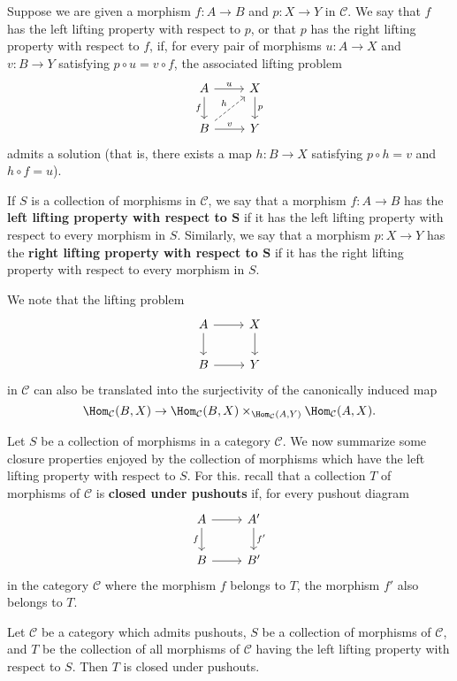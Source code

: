 Suppose we are given a morphism $f:A\to B$ and $p:X\to Y$ in $\mathcal{C}$. We say that $f$ has the left lifting property with respect to $p$, or that $p$ has the right lifting property with respect to $f$, if, for every pair of morphisms $u:A\to X$ and $v:B\to Y$ satisfying $p\circ u=v\circ f$, the associated lifting problem
\[\begin{tikzcd}
A\ar[r,"u"]\ar[d,swap,"f"]&X\ar[d,"p"]\\
B\ar[r,"v"]\ar[ru,dashed,"h"]&Y
\end{tikzcd}\]
admits a solution (that is, there exists a map $h:B\to X$ satisfying $p\circ h=v$ and $h\circ f=u$).\par
If $S$ is a collection of morphisms in $\mathcal{C}$, we say that a morphism $f:A\to B$ has the \textbf{left lifting property with respect to $\bm{S}$} if it has the left lifting property with respect to every morphism in $S$. Similarly, we say that a morphism $p:X\to Y$ has the \textbf{right lifting property with respect to $\bm{S}$} if it has the right lifting property with respect to every morphism in $S$.
\begin{remark}\label{category lifting problem iff surjectivity}
We note that the lifting problem
\[\begin{tikzcd}
A\ar[r]\ar[d,swap]&X\ar[d]\\
B\ar[r]&Y
\end{tikzcd}\]
in $\mathcal{C}$ can also be translated into the surjectivity of the canonically induced map
\[\Hom_{\mathcal{C}}(B,X)\to\Hom_{\mathcal{C}}(B,X)\times_{\Hom_{\mathcal{C}}(A,Y)}\Hom_{\mathcal{C}}(A,X).\]
\end{remark}
Let $S$ be a collection of morphisms in a category $\mathcal{C}$. We now summarize some closure properties enjoyed by the collection of morphisms which have the left lifting property with respect to $S$. For this. recall that a collection $T$ of morphisms of $\mathcal{C}$ is \textbf{closed under pushouts} if, for every pushout diagram
\[\begin{tikzcd}
A\ar[r]\ar[d,swap,"f"]&A'\ar[d,"f'"]\\
B\ar[r]&B'
\end{tikzcd}\]
in the category $\mathcal{C}$ where the morphism $f$ belongs to $T$, the morphism $f'$ also belongs to $T$.
\begin{proposition}\label{category left lifting closed under pushout}
Let $\mathcal{C}$ be a category which admits pushouts, $S$ be a collection of morphisms of $\mathcal{C}$, and $T$ be the collection of all morphisms of $\mathcal{C}$ having the left lifting property with respect to $S$. Then $T$ is closed under pushouts.
\end{proposition}
